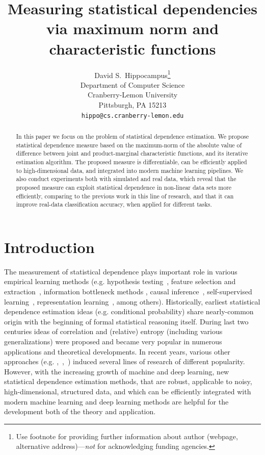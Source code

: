 \documentclass{article}
\title{Measuring statistical dependencies via maximum norm and characteristic functions}
\author{%
  David S.~Hippocampus\thanks{Use footnote for providing further information
    about author (webpage, alternative address)---\emph{not} for acknowledging
    funding agencies.} \\
  Department of Computer Science\\
  Cranberry-Lemon University\\
  Pittsburgh, PA 15213 \\
  \texttt{hippo@cs.cranberry-lemon.edu} \\
}
\begin{document}
\maketitle


\begin{abstract}
    In this paper we focus on the problem of statistical dependence estimation. We propose statistical dependence measure based on the maximum-norm of the absolute value of difference between joint and product-marginal characteristic functions, and its iterative estimation algorithm. The proposed measure is differentiable, can be efficiently applied to high-dimensional data, and integrated into modern machine learning pipelines. We also conduct experiments both with simulated and real data, which reveal that the proposed measure can exploit statistical dependence in non-linear data sets more efficiently, comparing to the previous work in this line of research, and that it can improve real-data classification accuracy, when applied for different tasks.
\end{abstract}

\section{Introduction}
The measurement of  statistical dependence plays important role in various empirical learning methods (e.g. hypothesis testing~\cite{Gretton2005MeasuringSD}, feature selection and extraction~\cite{EigenHSIC,HSCA}, information bottleneck methods \cite{Ma2020TheHB}, causal inference~\cite{NIPS2008_f7664060}, self-supervised learning~\cite{li2021selfsupervised}, representation learning~\cite{Ragonesi2021LearningUR}, among others).  Historically, earliest statistical dependence estimation ideas (e.g. conditional probability) share nearly-common origin with the beginning of formal statistical reasoning itself. During last two centuries ideas of correlation and (relative) entropy (including various generalizations) were proposed and became very popular in numerous applications and theoretical developments. In recent years, various other approaches  (e.g. \cite{Gretton2005MeasuringSD},~\cite{Feuerverger, Szekely},~\cite{Pczos2012CopulabasedKD}) induced several lines of research of different popularity. However, with the increasing growth of machine and deep learning, new statistical dependence estimation methods, that are robust, applicable to noisy, high-dimensional, structured data, and which can be efficiently integrated with modern machine learning and deep learning methods are helpful for the development both of the theory and application.
\end{document}
